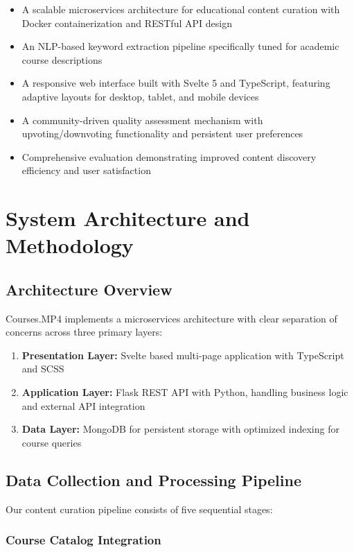 \documentclass[manuscript,nonacm]{acmart}
\begin{document}
\begin{itemize}
    \item A scalable microservices architecture for educational content curation with Docker containerization and RESTful API design
    \item An NLP-based keyword extraction pipeline specifically tuned for academic course descriptions
    \item A responsive web interface built with Svelte 5 and TypeScript, featuring adaptive layouts for desktop, tablet, and mobile devices
    \item A community-driven quality assessment mechanism with upvoting/downvoting functionality and persistent user preferences
    \item Comprehensive evaluation demonstrating improved content discovery efficiency and user satisfaction
\end{itemize}

\section{System Architecture and Methodology}

\subsection{Architecture Overview}

Courses.MP4 implements a microservices architecture with clear separation of concerns across three primary layers:

\begin{enumerate}
    \item \textbf{Presentation Layer:} Svelte based multi-page application with TypeScript and SCSS
    \item \textbf{Application Layer:} Flask REST API with Python, handling business logic and external API integration
    \item \textbf{Data Layer:} MongoDB for persistent storage with optimized indexing for course queries
\end{enumerate}

\subsection{Data Collection and Processing Pipeline}

Our content curation pipeline consists of five sequential stages:

\subsubsection{Course Catalog Integration}
\end{document}
